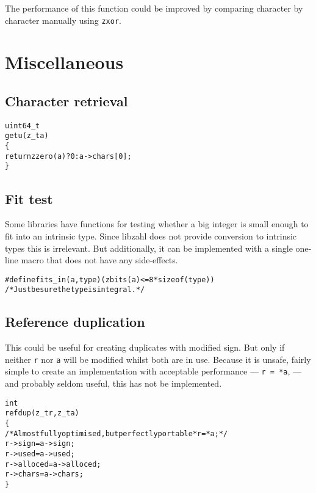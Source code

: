 \noindent
The performance of this function could
be improved by comparing character by
character manually using {\tt zxor}.


\newpage
\section{Miscellaneous}
\label{sec:Miscellaneous}


\subsection{Character retrieval}
\label{sec:Character retrieval}

\begin{alltt}
uint64_t
getu(z_t a)
\{
    return zzero(a) ? 0 : a->chars[0];
\}
\end{alltt}

\subsection{Fit test}
\label{sec:Fit test}

Some libraries have functions for testing
whether a big integer is small enough to
fit into an intrinsic type. Since libzahl
does not provide conversion to intrinsic
types this is irrelevant. But additionally,
it can be implemented with a single
one-line macro that does not have any
side-effects.

\begin{alltt}
   #define fits_in(a, type)  (zbits(a) <= 8 * sizeof(type))
   \textcolor{c}{/* \textrm{Just be sure the type is integral.} */}
\end{alltt}


\subsection{Reference duplication}
\label{sec:Reference duplication}

This could be useful for creating duplicates
with modified sign. But only if neither
{\tt r} nor {\tt a} will be modified whilst
both are in use. Because it is unsafe,
fairly simple to create an implementation
with acceptable performance — {\tt *r = *a},
— and probably seldom useful, this has not
be implemented.

\begin{alltt}
   int
   refdup(z_t r, z_t a)
   \{
       \textcolor{c}{/* \textrm{Almost fully optimised, but perfectly portable} *r = *a; */}
       r->sign    = a->sign;
       r->used    = a->used;
       r->alloced = a->alloced;
       r->chars   = a->chars;
   \}
\end{alltt}


